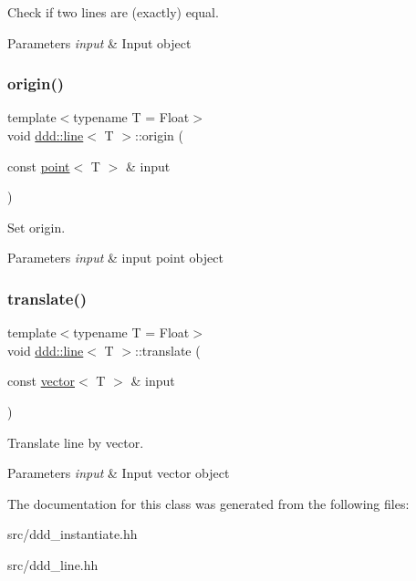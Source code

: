 Check if two lines are (exactly) equal. 


\begin{DoxyParams}{Parameters}
{\em input} & Input object \\
\hline
\end{DoxyParams}
\mbox{\label{classddd_1_1line_a531225ea04ea5f147adf76505ab13bcc}} 
\subsubsection{\texorpdfstring{origin()}{origin()}}
{\footnotesize\ttfamily template$<$typename T = Float$>$ \\
void \hyperlink{classddd_1_1line}{ddd\+::line}$<$ T $>$\+::origin (\begin{DoxyParamCaption}\item[{const \hyperlink{classddd_1_1point}{point}$<$ T $>$ \&}]{input }\end{DoxyParamCaption})\hspace{0.3cm}{\ttfamily [inline]}}



Set origin. 


\begin{DoxyParams}{Parameters}
{\em input} & input point object \\
\hline
\end{DoxyParams}
\mbox{\label{classddd_1_1line_a46e5ed85d7fe38fc3d4d4755b3f23568}} 
\subsubsection{\texorpdfstring{translate()}{translate()}}
{\footnotesize\ttfamily template$<$typename T = Float$>$ \\
void \hyperlink{classddd_1_1line}{ddd\+::line}$<$ T $>$\+::translate (\begin{DoxyParamCaption}\item[{const \hyperlink{classddd_1_1vector}{vector}$<$ T $>$ \&}]{input }\end{DoxyParamCaption})\hspace{0.3cm}{\ttfamily [inline]}}



Translate line by vector. 


\begin{DoxyParams}{Parameters}
{\em input} & Input vector object \\
\hline
\end{DoxyParams}


The documentation for this class was generated from the following files\+:\begin{DoxyCompactItemize}
\item 
src/ddd\+\_\+instantiate.\+hh\item 
src/ddd\+\_\+line.\+hh\end{DoxyCompactItemize}
